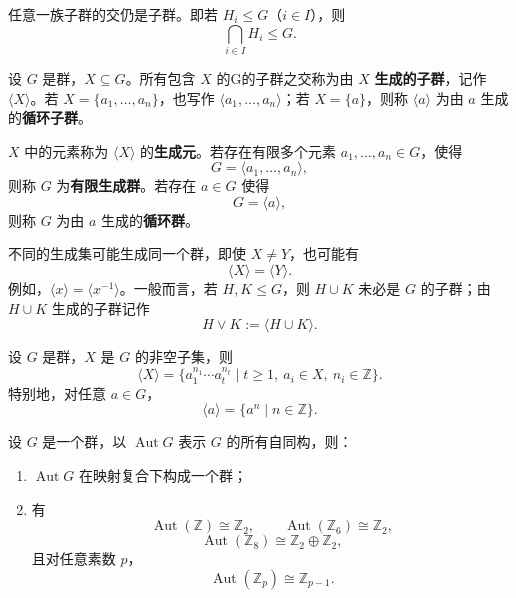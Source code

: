 \begin{corollary}\label{cor:intersection-subgroups}
任意一族子群的交仍是子群。即若 $H_i\leq G$（$i\in I$），则
\[
  \bigcap_{i\in I}H_i\leq G.
\]
\end{corollary}

\begin{definition}[生成子群]\label{def:generated-subgroup}
设 $G$ 是群，$X\subseteq G$。所有包含 $X$ 的G的子群之交称为由 $X$ \textbf{生成的子群}，记作 $\langle X\rangle$。若 $X=\{a_1,\ldots,a_n\}$，也写作 $\langle a_1,\ldots,a_n\rangle$；若 $X=\{a\}$，则称 $\langle a\rangle$ 为由 $a$ 生成的\textbf{循环子群}。

$X$ 中的元素称为 $\langle X\rangle$ 的\textbf{生成元}。若存在有限多个元素 $a_1,\ldots,a_n\in G$，使得
\[
  G=\langle a_1,\ldots,a_n\rangle,
\]
则称 $G$ 为\textbf{有限生成群}。若存在 $a\in G$ 使得
\[
  G=\langle a\rangle,
\]
则称 $G$ 为由 $a$ 生成的\textbf{循环群}。
\end{definition}

\begin{purplenote}
不同的生成集可能生成同一个群，即使 $X\neq Y$，也可能有
\[
  \langle X\rangle=\langle Y\rangle.
\]
例如，$\langle x\rangle=\langle x^{-1}\rangle$。一般而言，若 $H,K\leq G$，则 $H\cup K$ 未必是 $G$ 的子群；由 $H\cup K$ 生成的子群记作
\[
  H\vee K:=\langle H\cup K\rangle.
\]
\end{purplenote}

\begin{theorem}\label{thm:generated-subgroup-words}
设 $G$ 是群，$X$ 是 $G$ 的非空子集，则
\[
  \langle X\rangle
  =\bigl\{a_1^{n_1}\cdots a_t^{n_t}\mid
  t\geq1,\ a_i\in X,\ n_i\in\mathbb Z\bigr\}.
\]
特别地，对任意 $a\in G$，
\[
  \langle a\rangle=\{a^n\mid n\in\mathbb Z\}.
\]
\end{theorem}

\begin{proposition}[自同构群]\label{prop:automorphism-group}
设 $G$ 是一个群，以 $\operatorname{Aut}G$ 表示 $G$ 的所有自同构，则：
\begin{enumerate}[label=(\arabic*)]
  \item $\operatorname{Aut}G$ 在映射复合下构成一个群；
  \item 有
  \[
    \operatorname{Aut}(\mathbb Z)\cong \mathbb Z_2,
    \qquad
    \operatorname{Aut}(\mathbb Z_6)\cong \mathbb Z_2,
  \]
  \[
    \operatorname{Aut}(\mathbb Z_8)
    \cong \mathbb Z_2\oplus\mathbb Z_2,
  \]
  且对任意素数 $p$，
  \[
    \operatorname{Aut}(\mathbb Z_p)
    \cong \mathbb Z_{p-1}.
  \]
\end{enumerate}
\end{proposition}

